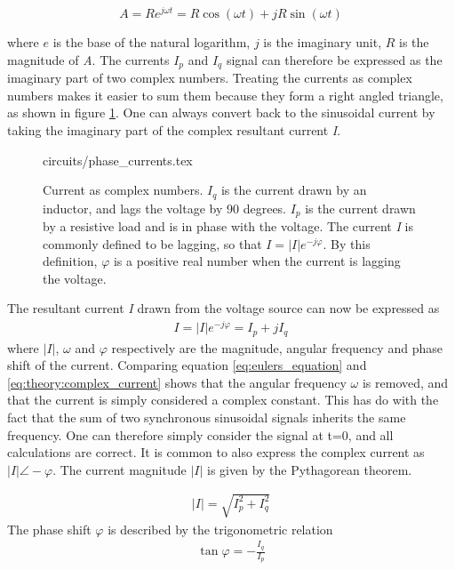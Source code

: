 \documentclass[class=book, crop=false]{standalone}
\begin{document}
\begin{equation}\label{eq:eulers_equation}
    A = Re^{j\omega t} = R\cos{(\omega t)} + jR\sin{(\omega t)}
\end{equation}

where $e$ is the base of the natural logarithm, $j$ is the imaginary unit, $R$ is the magnitude of \textit{A}. The currents $I_{p}$ and $I_{q}$ signal can therefore be expressed as the imaginary part of two complex numbers. Treating the currents as complex numbers makes it easier to sum them because they form a right angled triangle, as shown in figure \ref{fig:theory:phase_current}. One can always convert back to the sinusoidal current by taking the imaginary part of the complex resultant current \textit{I}.

\begin{figure}[ht!]
    \center
    {circuits/phase_currents.tex}
    \caption[size = 9]
    {Current as complex numbers. $I_{q}$ is the current drawn by an inductor, and lags the voltage by 90 degrees. $I_{p}$ is the current drawn by a resistive load and is in phase with the voltage. The current \textit{I} is commonly defined to be lagging, so that $I = |I|e^{-j\varphi}$. By this definition, $\varphi$ is a positive real number when the current is lagging the voltage.   }\label{fig:theory:phase_current}
\end{figure}

The resultant current \textit{I} drawn from the voltage source can now be expressed as 
\begin{equation}
   \begin{aligned}\label{eq:theory:complex_current}
I = |I|e^{-j \varphi} = I_{p} + jI_{q}
\end{aligned} 
\end{equation}
where $|I|$, $\omega$ and $\varphi$ respectively are  the magnitude, angular frequency and phase shift of the current. Comparing equation \eqref{eq:eulers_equation} and \eqref{eq:theory:complex_current} shows that the angular frequency $\omega$ is removed, and that the current is simply considered a complex constant. This has do with the fact that the sum of two synchronous sinusoidal signals inherits the same frequency. One can therefore simply consider the signal at t=0, and all calculations are correct. It is common to also express the complex current as $|I|\angle -\varphi$. The current magnitude $|I|$ is given by the Pythagorean theorem. 

\begin{equation}
   \begin{aligned}\label{eq:theory:pythagoras_current}
|I| = \sqrt{I_{p}^{2} + I_{q}^{2}}
\end{aligned} 
\end{equation}
The phase shift $\varphi$ is described by the trigonometric relation
\begin{equation}
   \begin{aligned}\label{eq:theory:phase_shift_current
   }
   \tan{\varphi} = -\frac{I_{q}}{I_{p}}
\end{aligned} 
\end{equation}
\end{document}
